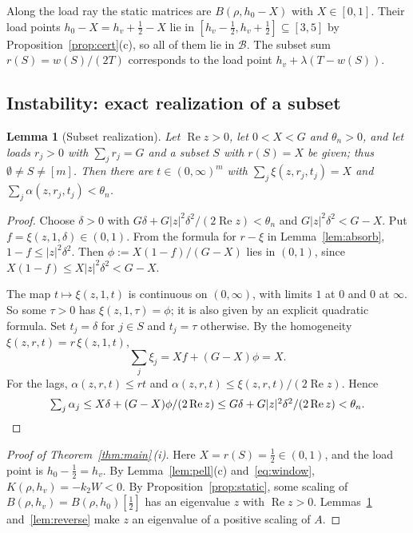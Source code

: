 \documentclass[11pt,a4paper]{article}
\theoremstyle{plain}
\newtheorem{lemma}[theorem]{Lemma}
\theoremstyle{definition}
\theoremstyle{remark}
\newcommand{\Real}{\operatorname{Re}}
\newcommand{\cB}{\mathcal{B}}
\begin{document}
Along the load ray the static matrices are $B(\rho,h_0-X)$ with $X\in[0,1]$. Their load
points $h_0-X=h_v+\tfrac12-X$ lie in $[h_v-\tfrac12,h_v+\tfrac12]\subseteq[3,5]$ by
Proposition~\ref{prop:cert}(c), so all of them lie in $\cB$. The subset sum
$r(S)=w(S)/(2T)$ corresponds to the load point $h_v+\lambda(T-w(S))$.

\subsection{Instability: exact realization of a subset}

\begin{lemma}[Subset realization]\label{lem:realize}
Let $\Real z>0$, let $0<X<G$ and $\theta_n>0$, and let loads $r_j>0$ with
$\sum_jr_j=G$ and a subset $S$ with $r(S)=X$ be given; thus $\emptyset\ne S\ne[m]$.
Then there are $t\in(0,\infty)^m$ with $\sum_j\xi(z,r_j,t_j)=X$ and
$\sum_j\alpha(z,r_j,t_j)<\theta_n$.
\end{lemma}
\begin{proof}
Choose $\delta>0$ with $G\delta+G|z|^2\delta^2/(2\Real z)<\theta_n$ and $G|z|^2\delta^2<G-X$.
Put $f=\xi(z,1,\delta)\in(0,1)$. From the formula for $r-\xi$ in
Lemma~\ref{lem:absorb}, $1-f\le|z|^2\delta^2$. Then $\phi:=X(1-f)/(G-X)$ lies in $(0,1)$,
since $X(1-f)\le X|z|^2\delta^2<G-X$.

The map $t\mapsto\xi(z,1,t)$ is continuous on $(0,\infty)$, with limits $1$ at $0$ and
$0$ at $\infty$. So some $\tau>0$ has $\xi(z,1,\tau)=\phi$; it is also given by an
explicit quadratic formula. Set $t_j=\delta$ for $j\in S$ and $t_j=\tau$ otherwise. By the
homogeneity $\xi(z,r,t)=r\,\xi(z,1,t)$,
\[
\textstyle\sum_j\xi_j=Xf+(G-X)\phi=X .
\]
For the lags, $\alpha(z,r,t)\le rt$ and $\alpha(z,r,t)\le\xi(z,r,t)/(2\Real z)$. Hence
\[
\textstyle\sum_j\alpha_j\le X\delta+(G-X)\phi/(2\Real z)\le G\delta+G|z|^2\delta^2/(2\Real z)<\theta_n.
\qedhere
\]
\end{proof}

\begin{proof}[Proof of Theorem~\ref{thm:main}\,(i)]
Here $X=r(S)=\tfrac12\in(0,1)$, and the load point is $h_0-\tfrac12=h_v$. By
Lemma~\ref{lem:pell}(c) and~\eqref{eq:window}, $K(\rho,h_v)=-k_2W<0$. By
Proposition~\ref{prop:static}, some scaling of $B(\rho,h_v)=B(\rho,h_0)[\tfrac12]$ has an
eigenvalue $z$ with $\Real z>0$. Lemmas~\ref{lem:realize} and~\ref{lem:reverse} make $z$
an eigenvalue of a positive scaling of $A$.
\end{proof}
\end{document}
